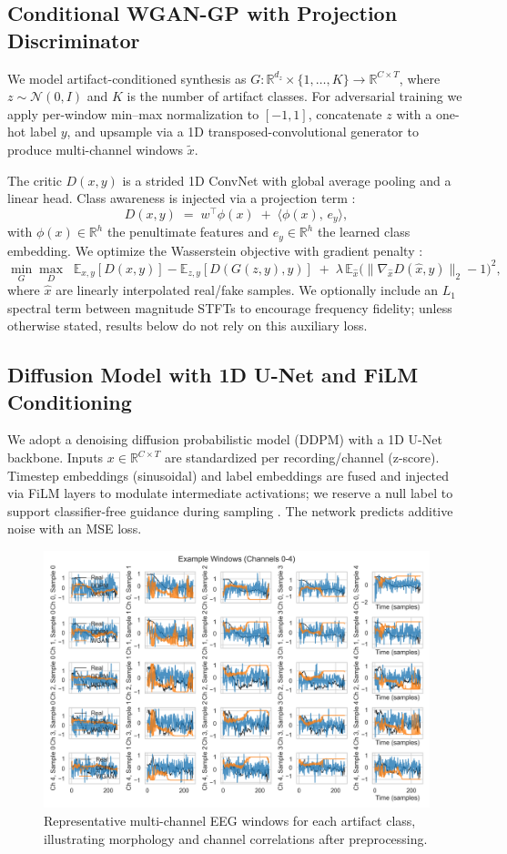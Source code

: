 \documentclass{article}
\begin{document}
\subsection{Conditional WGAN-GP with Projection Discriminator}
We model artifact-conditioned synthesis as $G:\mathbb{R}^{d_z}\times\{1,\dots,K\}\!\to\!\mathbb{R}^{C\times T}$, where $z\!\sim\!\mathcal{N}(0,I)$ and $K$ is the number of artifact classes. For adversarial training we apply per-window min--max normalization to $[-1,1]$, concatenate $z$ with a one-hot label $y$, and upsample via a 1D transposed-convolutional generator to produce multi-channel windows $\tilde{x}$. 

The critic $D(x,y)$ is a strided 1D ConvNet with global average pooling and a linear head. Class awareness is injected via a projection term \citep{miyato2018cgans}:
\[
D(x,y)\;=\;w^\top \phi(x)\;+\;\langle \phi(x),\, e_y\rangle,
\]
with $\phi(x)\in\mathbb{R}^h$ the penultimate features and $e_y\in\mathbb{R}^h$ the learned class embedding. We optimize the Wasserstein objective with gradient penalty \citep{gulrajani2017improved}:
\[
\min_{G}\max_{D}\;\;\mathbb{E}_{x,y}[D(x,y)]-\mathbb{E}_{z,y}[D(G(z,y),y)]
\;+\;\lambda\,\mathbb{E}_{\hat x}\big(\lVert\nabla_{\hat x}D(\hat x,y)\rVert_2-1\big)^2,
\]
where $\hat x$ are linearly interpolated real/fake samples. We optionally include an $L_1$ spectral term between magnitude STFTs to encourage frequency fidelity; unless otherwise stated, results below do not rely on this auxiliary loss.

\subsection{Diffusion Model with 1D U\!-Net and FiLM Conditioning}
We adopt a denoising diffusion probabilistic model (DDPM) \citep{ho2020denoising} with a 1D U\!-Net backbone. Inputs $x\in\mathbb{R}^{C\times T}$ are standardized per recording/channel (z-score). Timestep embeddings (sinusoidal) and label embeddings are fused and injected via FiLM layers to modulate intermediate activations; we reserve a null label to support classifier-free guidance during sampling \citep{ho2022classifierfree}. The network predicts additive noise with an MSE loss.

\begin{figure}[t]
  \centering
  \includegraphics[width=0.7\linewidth]{figs/examples_windows_multi.png}
  \caption{Representative multi-channel EEG windows for each artifact class, illustrating morphology and channel correlations after preprocessing.}
  \label{fig:examples-multi}
\end{figure}
\end{document}
